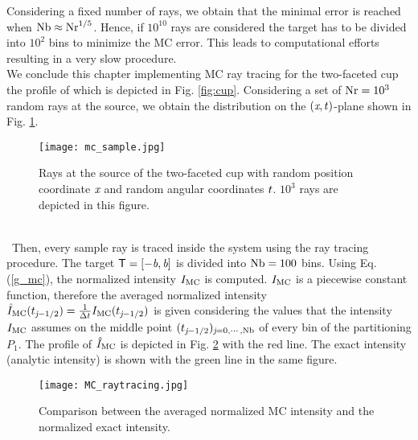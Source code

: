 Considering a fixed number of rays, we obtain that the minimal error is reached when $\textrm{Nb}\approx \textrm{Nr}^{1/5}$.
Hence, if $10^{10}$ rays are considered the target has to be divided into $10^2$ bins to minimize the MC error.
This leads to computational efforts resulting in a very slow procedure.\\ \indent
We conclude this chapter implementing MC ray tracing for the two-faceted cup the profile of which is depicted in Fig. \ref{fig:cup}. 
Considering a set of $\textrm{Nr} = 10^3$ random rays 
at the source, we obtain the distribution on the $(\textit{x}, t)$-plane shown in Fig. \ref{fig:mc_sample}.
\begin{figure}[h]
\begin{center}
    \texttt{[image: mc\_sample.jpg]}
    \caption{Rays at the source of the two-faceted cup with random position coordinate $\textit{x}$ and random angular coordinates $t$. $10^3$ rays are depicted in this figure.}
    \label{fig:mc_sample}
\end{center}
  \end{figure}
\\\ Then, every sample ray is traced inside the system using the ray tracing procedure. 
The target $\textsf{T} = [-\textit{b}, \textit{b}]$ is divided into $\textrm{Nb}= 100$ bins.
Using Eq. (\ref{g_mc}), the normalized intensity $I_{\textrm{MC}}$ is computed. $I_{\textrm{MC}}$  is a piecewise constant function, therefore the averaged normalized intensity  $\hat{I}_{\textrm{MC}}(t_{\textit{j}-1/2})= \frac{1}{\Delta t}I_{\textrm{MC}}(t_{\textit{j}-1/2})$ is given considering the values that the intensity $I_{\textrm{MC}}$ assumes on the middle point $(t_{\textit{j}-1/2})_{\textit{j} = 0, \cdots, \textrm{Nb}}$ of every bin of the partitioning $P_1$. The profile of $\hat{I}_{\textrm{MC}}$ is depicted in Fig. \ref{fig:mc_intensity} with the red line. The exact intensity (analytic intensity) is shown with the green line in the same figure.
\begin{figure}[t]
\begin{center}
    \texttt{[image: MC\_raytracing.jpg]}
    \caption{Comparison between the averaged normalized MC intensity and the normalized exact intensity.}
   \label{fig:mc_intensity}
\end{center}
\end{figure}
